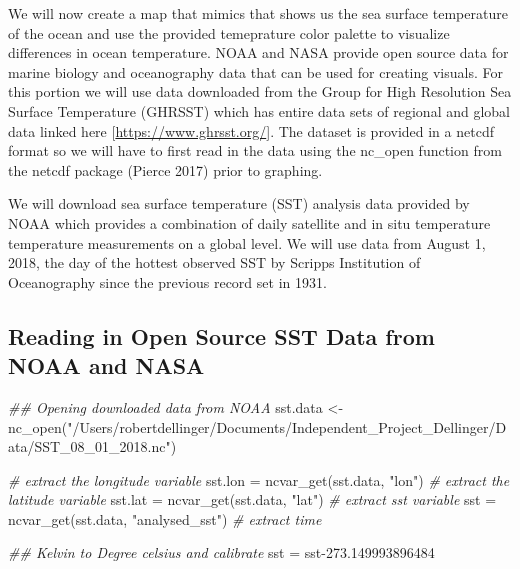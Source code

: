\documentclass[]{tufte-handout}
\newenvironment{Shaded}{}{}
\newcommand{\CommentTok}[1]{\textcolor[rgb]{0.38,0.63,0.69}{\textit{#1}}}
\newcommand{\DocumentationTok}[1]{\textcolor[rgb]{0.73,0.13,0.13}{\textit{#1}}}
\newcommand{\FloatTok}[1]{\textcolor[rgb]{0.25,0.63,0.44}{#1}}
\newcommand{\FunctionTok}[1]{\textcolor[rgb]{0.02,0.16,0.49}{#1}}
\newcommand{\NormalTok}[1]{#1}
\newcommand{\OtherTok}[1]{\textcolor[rgb]{0.00,0.44,0.13}{#1}}
\newcommand{\StringTok}[1]{\textcolor[rgb]{0.25,0.44,0.63}{#1}}
\begin{document}
We will now create a map that mimics that shows us the sea surface
temperature of the ocean and use the provided temeprature color palette
to visualize differences in ocean temperature. NOAA and NASA provide
open source data for marine biology and oceanography data that can be
used for creating visuals. For this portion we will use data downloaded
from the Group for High Resolution Sea Surface Temperature (GHRSST)
which has entire data sets of regional and global data linked here
{[}\url{https://www.ghrsst.org/}{]}. The dataset is provided in a netcdf
format so we will have to first read in the data using the nc\_open
function from the netcdf package (Pierce 2017) prior to graphing.

We will download sea surface temperature (SST) analysis data provided by
NOAA which provides a combination of daily satellite and in situ
temperature temperature measurements on a global level. We will use data
from August 1, 2018, the day of the hottest observed SST by Scripps
Institution of Oceanography since the previous record set in 1931.

\hypertarget{reading-in-open-source-sst-data-from-noaa-and-nasa}{%
\subsection{Reading in Open Source SST Data from NOAA and
NASA}\label{reading-in-open-source-sst-data-from-noaa-and-nasa}}

\begin{Shaded}
\begin{Highlighting}[]
\DocumentationTok{\#\# Opening downloaded data from NOAA }
\NormalTok{sst.data }\OtherTok{\textless{}{-}} \FunctionTok{nc\_open}\NormalTok{(}\StringTok{"/Users/robertdellinger/Documents/Independent\_Project\_Dellinger/Data/SST\_08\_01\_2018.nc"}\NormalTok{)}

\CommentTok{\# extract the longitude variable}
\NormalTok{sst.lon }\OtherTok{=} \FunctionTok{ncvar\_get}\NormalTok{(sst.data, }\StringTok{"lon"}\NormalTok{)}
\CommentTok{\# extract the latitude variable}
\NormalTok{sst.lat }\OtherTok{=} \FunctionTok{ncvar\_get}\NormalTok{(sst.data, }\StringTok{"lat"}\NormalTok{)}
\CommentTok{\# extract sst variable}
\NormalTok{sst }\OtherTok{=} \FunctionTok{ncvar\_get}\NormalTok{(sst.data, }\StringTok{"analysed\_sst"}\NormalTok{)}
\CommentTok{\# extract time }

\DocumentationTok{\#\# Kelvin to Degree celsius and calibrate}
\NormalTok{sst }\OtherTok{=}\NormalTok{ sst}\FloatTok{{-}273.149993896484}
\end{Highlighting}
\end{Shaded}
\end{document}

